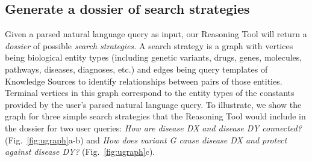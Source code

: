 \documentclass[11pt,notitlepage]{article}
\begin{document}
\subsection{Generate a dossier of search strategies}
\label{section:strategies}
Given a parsed natural language query as input, our Reasoning Tool will return
a {\em dossier\/} of possible {\em search strategies.\/} A search
strategy is a graph with vertices being biological entity types (including genetic
variants, drugs, genes, molecules, pathways, diseases, diagnoses,
etc.) and edges being query templates of Knowledge Sources to identify
relationships between pairs of those entities.
Terminal vertices in this graph correspond to
the entity types of the constants provided by the user's parsed natural language
query. To illustrate, we show the graph for three simple search strategies that
the Reasoning Tool would include in the dossier for two user queries: {\em How
  are disease DX and disease DY connected?\/} (Fig.~\ref{fig:ugraph}a-b) and
{\em How does variant G cause disease DX and protect against disease DY?\/}
(Fig.~\ref{fig:ugraph}c).
\end{document}
